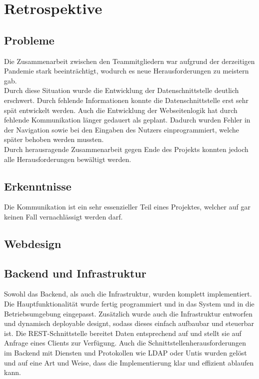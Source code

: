 \chapter{Retrospektive}
\section{Probleme}
Die Zusammenarbeit zwischen den Teammitgliedern war aufgrund der derzeitigen Pandemie stark beeinträchtigt, wodurch es neue Herausforderungen zu meistern gab.\\

Durch diese Situation wurde die Entwicklung der Datenschnittstelle deutlich erschwert. Durch fehlende Informationen konnte die Datenschnittstelle erst sehr spät entwickelt werden. Auch die Entwicklung der Webseitenlogik hat durch fehlende Kommunikation länger gedauert als geplant. Dadurch wurden Fehler in der Navigation sowie bei den Eingaben des Nutzers einprogrammiert, welche später behoben werden mussten.\\

Durch herausragende Zusammenarbeit gegen Ende des Projekts konnten jedoch alle Herausforderungen bewältigt werden.
\section{Erkenntnisse}
Die Kommunikation ist ein sehr essenzieller Teil eines Projektes, welcher auf gar keinen Fall vernachlässigt werden darf.

\section{Webdesign}

\newpage

\section{Backend und Infrastruktur}

Sowohl das Backend, als auch die Infrastruktur, wurden komplett implementiert. Die Hauptfunktionalität wurde fertig programmiert und in das System und in die Betriebsumgebung eingepasst. Zusätzlich wurde auch die Infrastruktur entworfen und dynamisch deployable designt, sodass dieses einfach aufbaubar und steuerbar ist. Die REST-Schnittstelle bereitet Daten entsprechend auf und stellt sie auf Anfrage eines Clients zur Verfügung. Auch die Schnittstellenherausforderungen im Backend mit Diensten und Protokollen wie LDAP oder Untis wurden gelöst und auf eine Art und Weise, dass die Implementierung klar und effizient ablaufen kann.\\

